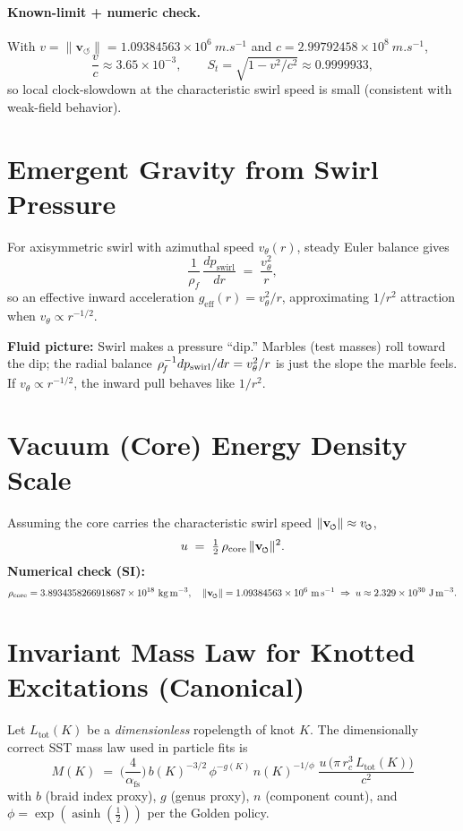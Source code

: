 \documentclass[10pt,reprint,aps,onecolumn,nofootinbib]{revtex4-2}
\newcommand{\swirlarrow}{%
    \mathchoice{\mkern-2mu\scriptstyle\boldsymbol{\circlearrowleft}}%
    {\mkern-2mu\scriptstyle\boldsymbol{\circlearrowleft}}%
    {\mkern-2mu\scriptscriptstyle\boldsymbol{\circlearrowleft}}%
    {\mkern-2mu\scriptscriptstyle\boldsymbol{\circlearrowleft}}%
}
\newcommand{\vswirl}{\mathbf{v}_{\swirlarrow}}
\newcommand{\vscore}{v_{\swirlarrow}}
\newcommand{\vnorm}{\lVert \vswirl \rVert}
\newcommand{\rhof}{\rho_{\!f}}
\newcommand{\rc}{r_c}
\newcommand{\xig}{\operatorname{asinh}\!\left(\tfrac{1}{2}\right)}
\newcommand{\phig}{\exp(\xig)}
\newcommand{\vswirlval}{1.09384563\times 10^{6}\ \si{m.s^{-1}}}
\newcommand{\rhocoreval}{3.8934358266918687\times 10^{18}\ \si{kg.m^{-3}}}
\newcommand{\cval}{2.99792458\times 10^{8}\ \si{m.s^{-1}}}
\begin{document}
    \paragraph*{Known-limit + numeric check.}
        With \(v=\lVert \mathbf{v}_{\!\boldsymbol{\circlearrowleft}}\rVert=\vswirlval\) and \(c=\cval\),
        \[
            \frac{v}{c}\approx 3.65\times10^{-3},\qquad
            S_t=\sqrt{1-v^2/c^2}\approx 0.9999933,
        \]
        so local clock-slowdown at the characteristic swirl speed is small (consistent with weak-field behavior).  \cite{Einstein1905}


\section*{Emergent Gravity from Swirl Pressure}
For axisymmetric swirl with azimuthal speed \(v_\theta(r)\), steady Euler balance gives
\[
\frac{1}{\rhof}\,\frac{dp_{\text{swirl}}}{dr} \;=\; \frac{v_\theta^2}{r},
\]
so an effective inward acceleration \(g_{\text{eff}}(r)=v_\theta^2/r\), approximating \(1/r^2\) attraction when \(v_\theta\propto r^{-1/2}\). %

\begin{analogynote}
\textbf{Fluid picture:} Swirl makes a pressure ``dip.'' Marbles (test masses) roll toward the dip; the radial balance \( \rhof^{-1} dp_{\rm swirl}/dr = v_\theta^2/r \) is just the slope the marble feels. If \(v_\theta\!\propto\! r^{-1/2}\), the inward pull behaves like \(1/r^2\).
\end{analogynote}


\section*{Vacuum (Core) Energy Density Scale}
Assuming the core carries the characteristic swirl speed \( \vnorm\approx \vscore \),
\[
u \;=\; \tfrac{1}{2}\,\rho_{\text{core}}\,\vnorm^2.
\]
\textbf{Numerical check (SI):}
\[
\rho_{\text{core}}=\rhocoreval,\quad \vnorm=\vswirlval
\;\Rightarrow\;
u \approx 2.329\times 10^{30}\ \si{J.m^{-3}}.
\]

\section*{Invariant Mass Law for Knotted Excitations (Canonical)}
Let \(L_{\text{tot}}(K)\) be a \emph{dimensionless} ropelength of knot \(K\). The dimensionally correct SST mass law used in particle fits is
\begin{equation}
\boxed{\
M(K)\;=\;\Big(\frac{4}{\alpha_{\mathrm{fs}}}\Big)\, b(K)^{-3/2}\,\phi^{-g(K)}\,n(K)^{-1/\phi}\;
\frac{u\,\big(\pi\,\rc^{3}\,L_{\text{tot}}(K)\big)}{c^{2}}\
}
\label{eq:mass-law}
\end{equation}
with \(b\) (braid index proxy), \(g\) (genus proxy), \(n\) (component count), and \(\phi=\phig\) per the Golden policy.
\end{document}
